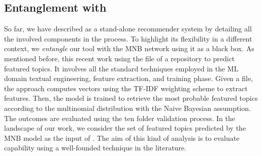 \subsection{Entanglement with \MNB}

So far, we have described \CT as a stand-alone recommender system by detailing all the involved components in the process. To highlight its flexibility in a different context, we \emph{entangle} our tool with the MNB network using it as a black box. As mentioned before, this recent work using the \RM file of a repository to predict featured topics. It involves all the standard techniques employed in the ML domain \ie textual engineering, feature extraction, and training phase. Given a \RM file, the approach computes vectors using the TF-IDF weighting scheme to extract features. Then, the model is trained to retrieve the most probable featured topics according to the multinomial distribution with the Naive Bayesian assumption. The outcomes are evaluated using the ten folder validation process. In the landscape of our work, we consider the set of featured topics predicted by the MNB model as the input of \CT. The aim of this kind of analysis is to evaluate \CT capability using a well-founded technique in the literature.
